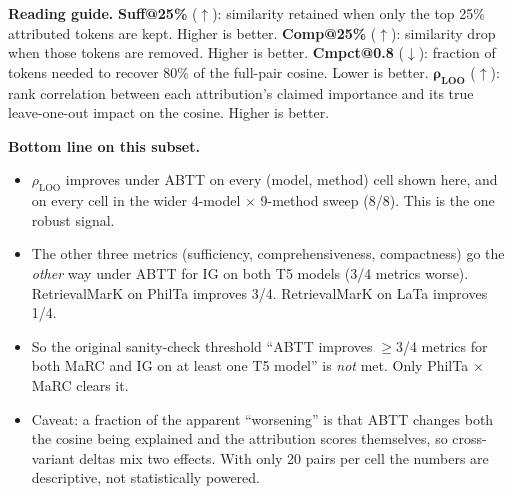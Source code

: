 \documentclass[11pt]{article}
\begin{document}
\noindent\textbf{Reading guide.}
\textbf{Suff@25\%} ($\uparrow$): similarity retained when only the top 25\% attributed tokens are kept. Higher is better.
\textbf{Comp@25\%} ($\uparrow$): similarity drop when those tokens are removed. Higher is better.
\textbf{Cmpct@0.8} ($\downarrow$): fraction of tokens needed to recover 80\% of the full-pair cosine. Lower is better.
$\boldsymbol{\rho_{\text{LOO}}}$ ($\uparrow$): rank correlation between each attribution's claimed importance and its true leave-one-out impact on the cosine. Higher is better.

\vspace{0.6em}

\noindent\textbf{Bottom line on this subset.}
\begin{itemize}
\itemsep0em
\item $\rho_{\text{LOO}}$ improves under ABTT on every (model, method) cell shown here, and on every cell in the wider 4-model $\times$ 9-method sweep (8/8). This is the one robust signal.
\item The other three metrics (sufficiency, comprehensiveness, compactness) go the \emph{other} way under ABTT for IG on both T5 models (3/4 metrics worse). RetrievalMarK on PhilTa improves 3/4. RetrievalMarK on LaTa improves 1/4.
\item So the original sanity-check threshold ``ABTT improves $\geq$3/4 metrics for both MaRC and IG on at least one T5 model'' is \emph{not} met. Only PhilTa $\times$ MaRC clears it.
\item Caveat: a fraction of the apparent ``worsening'' is that ABTT changes both the cosine being explained and the attribution scores themselves, so cross-variant deltas mix two effects. With only 20 pairs per cell the numbers are descriptive, not statistically powered.
\end{itemize}
\end{document}
